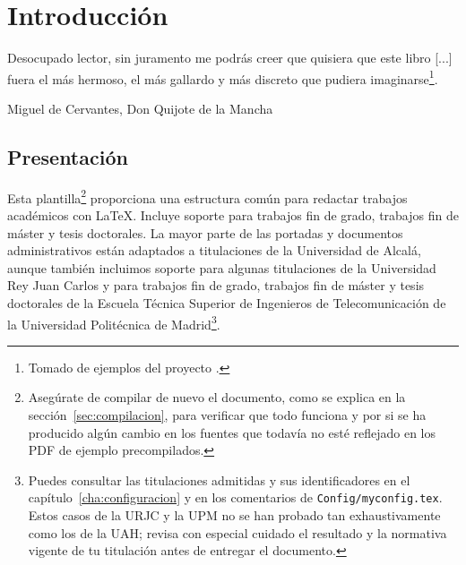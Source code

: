%

\chapter{Introducción}
\label{cha:introduccion}

\begin{FraseCelebre}
  \begin{Frase}
    Desocupado lector, sin juramento me podrás creer que quisiera que este libro [...] fuera el más hermoso, el más gallardo y más discreto que pudiera imaginarse\footnote{Tomado de ejemplos del proyecto \texis{}.}.
  \end{Frase}
  \begin{Fuente}
    Miguel de Cervantes, Don Quijote de la Mancha
  \end{Fuente}
\end{FraseCelebre}


\section{Presentación}
\label{sec:presentacion}

Esta plantilla\footnote{Asegúrate de compilar de nuevo el documento, como se explica en la sección~\ref{sec:compilacion}, para verificar que todo funciona y por si se ha producido algún cambio en los fuentes que todavía no esté reflejado en los PDF de ejemplo precompilados.} proporciona una estructura común para redactar trabajos académicos con \LaTeX{}. Incluye soporte para trabajos fin de grado, trabajos fin de máster y tesis doctorales. La mayor parte de las portadas y documentos administrativos están adaptados a titulaciones de la Universidad de Alcalá, aunque también incluimos soporte para algunas titulaciones de la Universidad Rey Juan Carlos y para trabajos fin de grado, trabajos fin de máster y tesis doctorales de la Escuela Técnica Superior de Ingenieros de Telecomunicación de la Universidad Politécnica de Madrid\footnote{Puedes consultar las titulaciones admitidas y sus identificadores en el capítulo~\ref{cha:configuracion} y en los comentarios de \texttt{Config/myconfig.tex}. Estos casos de la URJC y la UPM no se han probado tan exhaustivamente como los de la UAH; revisa con especial cuidado el resultado y la normativa vigente de tu titulación antes de entregar el documento.}.

